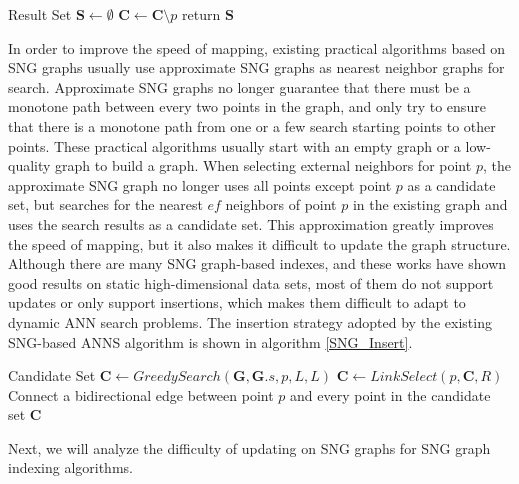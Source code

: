 \begin{algorithm}[h]
	\caption{$LinkSelect(p,\mathbf{C},R)$}
	\label{SNG_LinkSelect}
	Result Set $\mathbf{S} \leftarrow \emptyset$\;
	$\mathbf{C} \leftarrow \mathbf{C} \setminus p$\;
	return $\mathbf{S}$\;
\end{algorithm}
In order to improve the speed of mapping, existing practical algorithms based on SNG graphs usually use approximate SNG graphs as nearest neighbor graphs for search. Approximate SNG graphs no longer guarantee that there must be a monotone path between every two points in the graph, and only try to ensure that there is a monotone path from one or a few search starting points to other points. These practical algorithms usually start with an empty graph or a low-quality graph to build a graph. When selecting external neighbors for point $p$, the approximate SNG graph no longer uses all points except point $p$ as a candidate set, but searches for the nearest $ef$ neighbors of point $p$ in the existing graph and uses the search results as a candidate set. This approximation greatly improves the speed of mapping, but it also makes it difficult to update the graph structure. Although there are many SNG graph-based indexes, and these works have shown good results on static high-dimensional data sets, most of them do not support updates or only support insertions, which makes them difficult to adapt to dynamic ANN search problems. The insertion strategy adopted by the existing SNG-based ANNS algorithm is shown in algorithm \ref{SNG_Insert}.

\begin{algorithm}[h]
	\caption{$Insert(p,\mathbf{G},R,L)$}
	\label{SNG_Insert}
	Candidate Set $\mathbf{C} \leftarrow GreedySearch(\mathbf{G},\mathbf{G}.s,p,L,L)$\;
	$\mathbf{C} \leftarrow LinkSelect(p,\mathbf{C},R)$\;
	Connect a bidirectional edge between point $p$ and every point in the candidate set $\mathbf{C}$\;
\end{algorithm}

Next, we will analyze the difficulty of updating on SNG graphs for SNG graph indexing algorithms.
